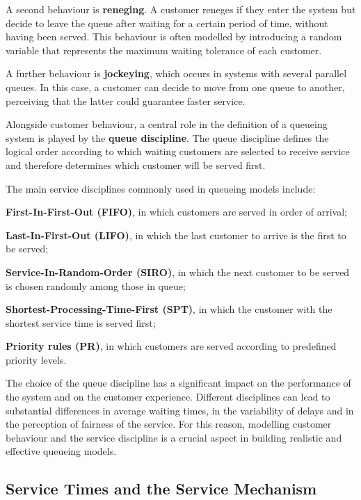 A second behaviour is \textbf{reneging}. A customer reneges if they enter the system but decide to leave the queue after waiting for a certain period of time, without having been served. This behaviour is often modelled by introducing a random variable that represents the maximum waiting tolerance of each customer.

A further behaviour is \textbf{jockeying}, which occurs in systems with several parallel queues. In this case, a customer can decide to move from one queue to another, perceiving that the latter could guarantee faster service.

Alongside customer behaviour, a central role in the definition of a queueing system is played by the \textbf{queue discipline}. The queue discipline defines the logical order according to which waiting customers are selected to receive service and therefore determines which customer will be served first.

The main service disciplines commonly used in queueing models include:
\begin{compactitemize}
    \item \textbf{First-In-First-Out (FIFO)}, in which customers are served in order of arrival;
    \item \textbf{Last-In-First-Out (LIFO)}, in which the last customer to arrive is the first to be served;
    \item \textbf{Service-In-Random-Order (SIRO)}, in which the next customer to be served is chosen randomly among those in queue;
    \item \textbf{Shortest-Processing-Time-First (SPT)}, in which the customer with the shortest service time is served first;
    \item \textbf{Priority rules (PR)}, in which customers are served according to predefined priority levels.
\end{compactitemize}

The choice of the queue discipline has a significant impact on the performance of the system and on the customer experience. Different disciplines can lead to substantial differences in average waiting times, in the variability of delays and in the perception of fairness of the service. For this reason, modelling customer behaviour and the service discipline is a crucial aspect in building realistic and effective queueing models.

\subsection{Service Times and the Service Mechanism}

